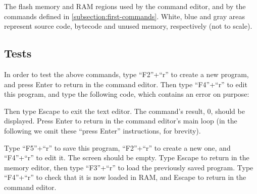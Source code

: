 \begin{Figure}
  

  \caption{The flash memory and RAM regions used by the command editor, and by
  the commands defined in \cref{subsection:first-commands}. White, blue and
  gray areas represent source code, bytecode and unused memory, respectively
  (not to scale).}\label{fig:command-editor-memory-map}
\end{Figure}

\subsection{Tests}

In order to test the above commands, type ``F2''+``r'' to create a new program,
and press Enter to return in the command editor. Then type ``F4''+``r'' to
edit this program, and type the following code, which contains an error on
purpose:


\noindent Then type Escape to exit the text editor. The command's result, 0,
should be displayed. Press Enter to return in the command editor's main loop
(in the following we omit these ``press Enter'' instructions, for brevity).

Type ``F5''+``r'' to save this program, ``F2''+``r'' to create a new one, and
``F4''+``r'' to edit it. The screen should be empty. Type Escape to return
in the memory editor, then type ``F3''+``r'' to load the previously saved
program. Type ``F4''+``r'' to check that it is now loaded in RAM, and
Escape to return in the command editor.

